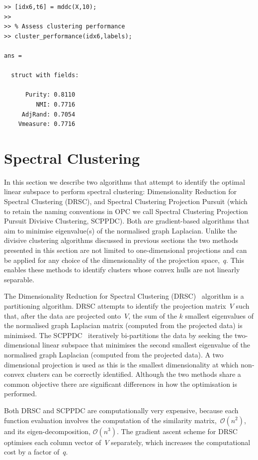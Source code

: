 \documentclass{book}
\begin{document}
\begin{verbatim}
>> [idx6,t6] = mddc(X,10);
>> 
>> % Assess clustering performance
>> cluster_performance(idx6,labels);

ans = 

  struct with fields:

      Purity: 0.8110
         NMI: 0.7716
     AdjRand: 0.7054
    Vmeasure: 0.7716

\end{verbatim}


\section{Spectral Clustering}

In this section we describe two algorithms that attempt to identify the optimal
linear subspace to perform spectral clustering: Dimensionality Reduction for
Spectral Clustering (DRSC), and Spectral Clustering Projection Pursuit (which
to retain the naming conventions in OPC we call Spectral Clustering Projection
Pursuit Divisive Clustering, SCPPDC).
%
Both are gradient-based algorithms that aim to minimise eigenvalue(s) of the
normalised graph Laplacian.
%
Unlike the divisive clustering algorithms discussed in previous sections
the two methods presented in this section are not limited to
one-dimensional projections and can be applied for any choice of the
dimensionality of the projection space,~$q$.
%
This enables these methods to identify clusters whose convex hulls
are not linearly separable.



The Dimensionality Reduction for Spectral Clustering (DRSC)~\cite{NiuDJ2011}
algorithm is a partitioning algorithm. DRSC attempts to identify the projection
matrix~$V$ such that, after the data are projected onto~$V$, the sum of
the $k$ smallest eigenvalues of the normalised graph Laplacian matrix
(computed from the projected data) is minimised.
%
The SCPPDC~\cite{HofmeyrPE2018} iteratively bi-partitions the data by seeking
the two-dimensional linear subspace that minimises the second smallest
eigenvalue of the normalised graph Laplacian (computed from the projected
data).
%
A two dimensional projection is used as this is the smallest dimensionality at
which non-convex clusters can be correctly identified.
%
Although the two methods share a common objective there are significant
differences in how the optimisation is performed. 


Both DRSC and SCPPDC are computationally very expensive, because each function evaluation involves
the computation of the similarity matrix,~$\mathcal{O}(n^2)$, and its eigen-decomposition,
$\mathcal{O}(n^3)$.
%
The gradient ascent scheme for DRSC optimises each column vector
of~$V$ separately, which increases the computational cost by a factor of~$q$.
%
%
\end{document}
